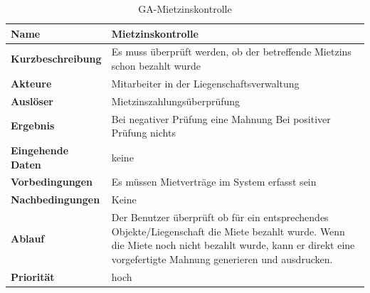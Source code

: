 \begin{table}[H]
  \centering
  \settowidth{}
  \setlength\extrarowheight{2pt}
  \begin{tabulary}{1.0\textwidth}{|a|m{12cm}|}
    \hline
    \textbf{Name}&Mietzinskontrolle\\
    \hline 
    \textbf{Kurzbeschreibung} & Es muss überprüft werden, ob der betreffende Mietzins schon bezahlt wurde \\
    \hline
    \textbf{Akteure} & Mitarbeiter in der Liegenschaftsverwaltung\\
    \hline
    \textbf{Auslöser} & Mietzinszahlungsüberprüfung\\
    \hline
    \textbf{Ergebnis} & Bei negativer Prüfung eine Mahnung\newline 
    Bei positiver Prüfung nichts\\
    \hline
    \textbf{Eingehende Daten} & keine\\
    \hline
    \textbf{Vorbedingungen} & Es müssen Mietverträge im System erfasst sein\\
    \hline
    \textbf{Nachbedingungen} & Keine \\
    \hline
    \textbf{Ablauf} & Der Benutzer überprüft ob für ein entsprechendes Objekte/Liegenschaft die Miete bezahlt wurde. Wenn die Miete noch nicht bezahlt wurde, kann er direkt eine vorgefertigte Mahnung generieren und ausdrucken.\\
    \hline
    \textbf{Priorität} & hoch\\
    \hline
  \end{tabulary}
  \caption{GA-Mietzinskontrolle}
\end{table}